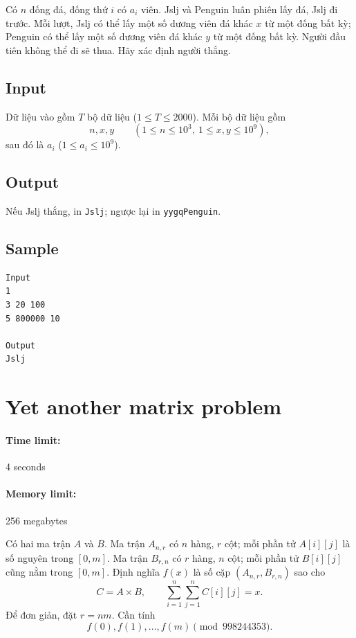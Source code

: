 \documentclass[11pt]{article}
\begin{document}
Có \(n\) đống đá, đống thứ \(i\) có \(a_i\) viên. Jslj và Penguin luân phiên
lấy đá, Jslj đi trước. Mỗi lượt, Jslj có thể lấy một số dương viên đá khác
\(x\) từ một đống bất kỳ; Penguin có thể lấy một số dương viên đá khác \(y\)
từ một đống bất kỳ. Người đầu tiên không thể đi sẽ thua. Hãy xác định người
thắng.

\subsection*{Input}

Dữ liệu vào gồm \(T\) bộ dữ liệu (\(1\le T\le 2000\)). Mỗi bộ dữ liệu gồm
\[
  n,x,y\qquad (1\le n\le 10^3,\ 1\le x,y\le 10^9),
\]
sau đó là \(a_i\) (\(1\le a_i\le 10^9\)).

\subsection*{Output}

Nếu Jslj thắng, in \texttt{Jslj}; ngược lại in \texttt{yygqPenguin}.

\subsection*{Sample}

\begin{verbatim}
Input
1
3 20 100
5 800000 10

Output
Jslj
\end{verbatim}

\section{Yet another matrix problem}

\paragraph{Time limit:} 4 seconds
\paragraph{Memory limit:} 256 megabytes

Có hai ma trận \(A\) và \(B\). Ma trận \(A_{n,r}\) có \(n\) hàng, \(r\) cột;
mỗi phần tử \(A[i][j]\) là số nguyên trong \([0,m]\). Ma trận \(B_{r,n}\) có
\(r\) hàng, \(n\) cột; mỗi phần tử \(B[i][j]\) cũng nằm trong \([0,m]\).
Định nghĩa \(f(x)\) là số cặp \((A_{n,r},B_{r,n})\) sao cho
\[
  C=A\times B,\qquad \sum_{i=1}^n\sum_{j=1}^n C[i][j]=x.
\]
Để đơn giản, đặt \(r=nm\). Cần tính
\[
  f(0),f(1),\ldots,f(m)\pmod {998244353}.
\]
\end{document}
